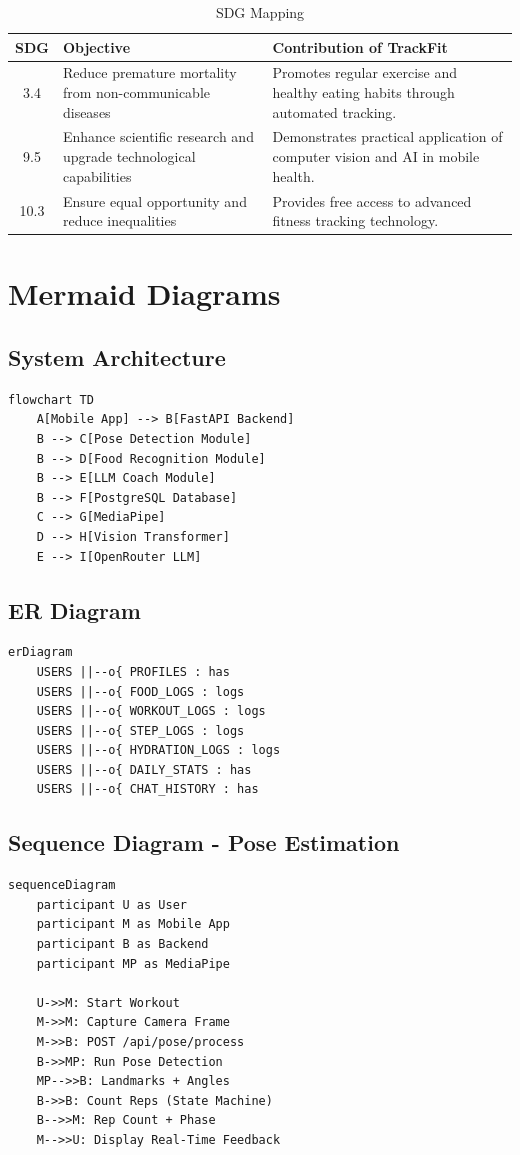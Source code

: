 \documentclass[12pt]{report}
\begin{document}
\begin{table}[H]
\centering
\begin{tabular}{|c|p{6cm}|p{6cm}|}
\hline
\textbf{SDG} & \textbf{Objective} & \textbf{Contribution of TrackFit} \\ \hline
3.4 & Reduce premature mortality from non-communicable diseases & Promotes regular exercise and healthy eating habits through automated tracking. \\ \hline
9.5 & Enhance scientific research and upgrade technological capabilities & Demonstrates practical application of computer vision and AI in mobile health. \\ \hline
10.3 & Ensure equal opportunity and reduce inequalities & Provides free access to advanced fitness tracking technology. \\ \hline
\end{tabular}
\caption{SDG Mapping}
\end{table}

\appendix
\chapter{Mermaid Diagrams}
\section{System Architecture}
\begin{verbatim}
flowchart TD
    A[Mobile App] --> B[FastAPI Backend]
    B --> C[Pose Detection Module]
    B --> D[Food Recognition Module]
    B --> E[LLM Coach Module]
    B --> F[PostgreSQL Database]
    C --> G[MediaPipe]
    D --> H[Vision Transformer]
    E --> I[OpenRouter LLM]
\end{verbatim}

\section{ER Diagram}
\begin{verbatim}
erDiagram
    USERS ||--o{ PROFILES : has
    USERS ||--o{ FOOD_LOGS : logs
    USERS ||--o{ WORKOUT_LOGS : logs
    USERS ||--o{ STEP_LOGS : logs
    USERS ||--o{ HYDRATION_LOGS : logs
    USERS ||--o{ DAILY_STATS : has
    USERS ||--o{ CHAT_HISTORY : has
\end{verbatim}

\section{Sequence Diagram - Pose Estimation}
\begin{verbatim}
sequenceDiagram
    participant U as User
    participant M as Mobile App
    participant B as Backend
    participant MP as MediaPipe
    
    U->>M: Start Workout
    M->>M: Capture Camera Frame
    M->>B: POST /api/pose/process
    B->>MP: Run Pose Detection
    MP-->>B: Landmarks + Angles
    B->>B: Count Reps (State Machine)
    B-->>M: Rep Count + Phase
    M-->>U: Display Real-Time Feedback
\end{verbatim}
\end{document}
